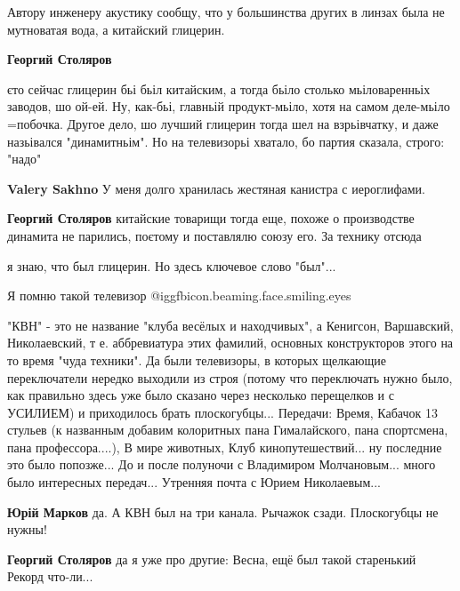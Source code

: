 \begin{itemize}
Автору инженеру акустику сообщу, что у большинства других в линзах была не
мутноватая вода, а китайский глицерин.

\begin{itemize} %
\textbf{Георгий Столяров} 

єто сейчас глицерин бьі бьіл китайским, а тогда бьіло столько мьіловаренньіх
заводов, шо ой-ей. Ну, как-бьі, главньій продукт-мьіло, хотя на самом
деле-мьіло =побочка. Другое дело, шо лучший глицерин тогда шел на взрьівчатку,
и даже назьівался "динамитньім". Но на телевизорьі хватало, бо партия сказала,
строго: "надо"

\begin{itemize} %
\textbf{Valery Sakhno} У меня долго хранилась жестяная канистра с иероглифами.

\textbf{Георгий Столяров} китайские товарищи тогда еще, похоже о производстве динамита не парились, поєтому и поставлялю союзу его. За технику отсюда
\end{itemize} %

я знаю, что был глицерин. Но здесь ключевое слово "был"...

\end{itemize} %

Я помню такой телевизор @igg{fbicon.beaming.face.smiling.eyes} 


"КВН" - это не название "клуба весёлых и находчивых", а Кенигсон, Варшавский,
Николаевский, т е. аббревиатура этих фамилий, основных конструкторов этого на
то время "чуда техники". Да были телевизоры, в которых щелкающие переключатели
нередко выходили из строя (потому что переключать нужно было, как правильно
здесь уже было сказано через несколько перещелков и с УСИЛИЕМ) и приходилось
брать плоскогубцы... Передачи: Время, Кабачок 13 стульев (к названным добавим
колоритных пана Гималайского, пана спортсмена, пана профессора....), В мире
животных, Клуб кинопутешествий... ну последние это было попозже... До и после
полуночи с Владимиром Молчановым... много было интересных передач... Утренняя
почта с Юрием Николаевым...

\begin{itemize} %
\textbf{Юрій Марков} да. А КВН был на три канала. Рычажок сзади. Плоскогубцы не нужны!

\begin{itemize} %
\textbf{Георгий Столяров} да я уже про другие: Весна, ещё был такой старенький Рекорд что-ли...


\end{itemize}
\end{itemize}
\end{itemize}
